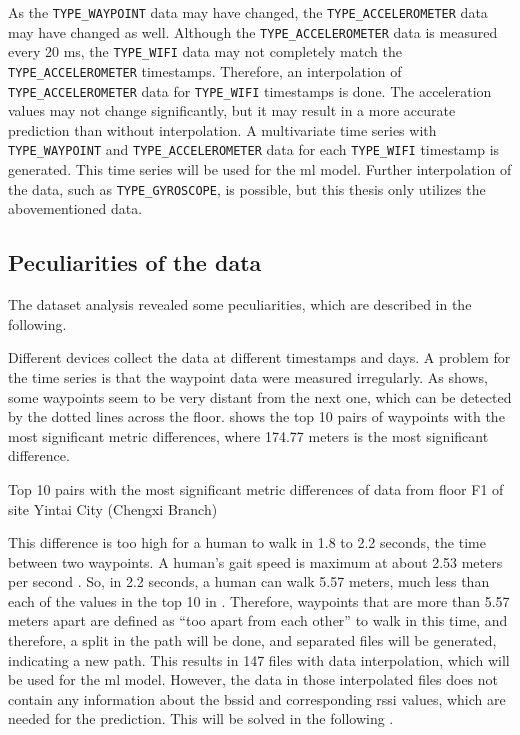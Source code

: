 As the \texttt{TYPE\_WAYPOINT} data may have changed, the \texttt{TYPE\_ACCELEROMETER} data may have changed as well.
Although the \texttt{TYPE\_ACCELEROMETER} data is measured every 20 ms, the \texttt{TYPE\_WIFI} data may not completely match the \texttt{TYPE\_ACCELEROMETER} timestamps.
Therefore, an interpolation of \texttt{TYPE\_ACCELEROMETER} data for \texttt{TYPE\_WIFI} timestamps is done.
The acceleration values may not change significantly, but it may result in a more accurate prediction than without interpolation.
A multivariate time series with \texttt{TYPE\_WAYPOINT} and \texttt{TYPE\_ACCELEROMETER} data for each \texttt{TYPE\_WIFI} timestamp is generated.
This time series will be used for the \ac{ml} model.
Further interpolation of the data, such as \texttt{TYPE\_GYROSCOPE}, is possible, but this thesis only utilizes the abovementioned data.


\subsection{Peculiarities of the data}\label{sec:special-cases}
The dataset analysis revealed some peculiarities, which are described in the following.

Different devices collect the data at different timestamps and days.
A problem for the time series is that the waypoint data were measured irregularly.
As  shows, some waypoints seem to be very distant from the next one, which can be detected by the dotted lines across the floor.
 shows the top 10 pairs of waypoints with the most significant metric differences, where 174.77 meters is the most significant difference.

\begin{table}[h]
    \centering
    \caption{Top 10 pairs with the most significant metric differences of data from floor F1 of site Yintai City (Chengxi Branch)}
    
    \label{tab:metric-diff}
\end{table}

This difference is too high for a human to walk in 1.8 to 2.2 seconds, the time between two waypoints.
A human's gait speed is maximum at about 2.53 meters per second \cite{bohannonComfortableMaximumWalking1997}.
So, in 2.2 seconds, a human can walk 5.57 meters, much less than each of the values in the top 10 in .
Therefore, waypoints that are more than 5.57 meters apart are defined as ``too apart from each other'' to walk in this time, and therefore, a split in the path will be done, and separated files will be generated, indicating a new path.
This results in 147 files with data interpolation, which will be used for the \ac{ml} model.
However, the data in those interpolated files does not contain any information about the \ac{bssid} and corresponding \ac{rssi} values, which are needed for the prediction.
This will be solved in the following .


